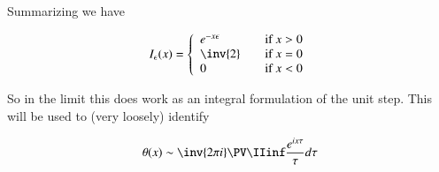 Summarizing we have

\begin{align*}
I_\epsilon(x) =
\left\{
\begin{array}{l l}
e^{-x\epsilon} & \quad \mbox{if $x > 0$} \\
\inv{2} & \quad \mbox{if $x = 0$} \\
0 & \quad \mbox{if $x < 0$} \\
\end{array}
\right.
\end{align*}

So in the limit this does work as an integral formulation of the unit step.  This will be used to (very loosely) identify

\begin{align}\label{eqn:poisson:heavysideUnitIntegral}
\theta(x) \sim \inv{2\pi i} \PV \IIinf \frac{e^{ix\tau}}{\tau} d\tau
\end{align}
\EndArticle
